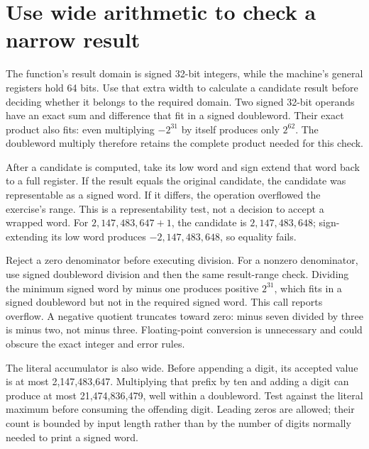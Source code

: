\section{Use wide arithmetic to check a narrow result}\label{expression-arithmetic}
The function's result domain is signed 32-bit integers, while the machine's general
registers hold 64 bits. Use that extra width to calculate a candidate result before
deciding whether it belongs to the required domain. Two signed 32-bit operands have
an exact sum and difference that fit in a signed doubleword. Their exact product
also fits: even multiplying $-2^{31}$ by itself produces only $2^{62}$.
The doubleword multiply therefore retains the complete product needed for this check.

After a candidate is computed, take its low word and sign extend that word back to
a full register. If the result equals the original candidate, the candidate was
representable as a signed word. If it differs, the operation overflowed the exercise's
range. This is a representability test, not a decision to accept a wrapped word.
For $2{,}147{,}483{,}647+1$, the candidate is $2{,}147{,}483{,}648$; sign-extending
its low word produces $-2{,}147{,}483{,}648$, so equality fails.

Reject a zero denominator before executing division. For a nonzero denominator,
use signed doubleword division and then the same result-range check. Dividing the
minimum signed word by minus one produces positive $2^{31}$, which fits in a
signed doubleword but not in the required signed word. This call reports overflow.
A negative quotient truncates toward zero: minus seven divided by three is minus
two, not minus three. Floating-point conversion is unnecessary and could obscure
the exact integer and error rules.

The literal accumulator is also wide. Before appending a digit, its accepted value
is at most 2,147,483,647. Multiplying that prefix by ten and adding a digit can produce
at most 21,474,836,479, well within a doubleword. Test against the literal maximum
before consuming the offending digit. Leading zeros are allowed; their count is
bounded by input length rather than by the number of digits normally needed to print
a signed word.
